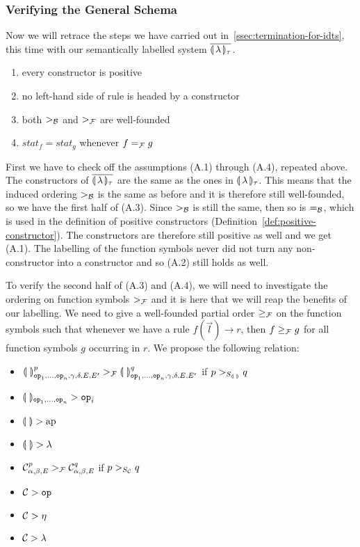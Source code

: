 \subsubsection{Verifying the General Schema}
\label{sssec:general-schema-2}

Now we will retrace the steps we have carried out
in~\ref{ssec:termination-for-idts}, this time with our semantically
labelled system ${\overline{\llparenthesis \, \lambda \, \rrparenthesis_\tau}}$.

\begin{enumerate}
  \item every constructor is positive
  \item no left-hand side of rule is headed by a constructor
  \item both $>_{\mathcal{B}}$ and $>_{\mathcal{F}}$ are well-founded
  \item $stat_f = stat_g$ whenever $f =_{\mathcal{F}} g$
\end{enumerate}

First we have to check off the assumptions (A.1) through (A.4), repeated
above. The constructors of ${\overline{\llparenthesis \, \lambda \, \rrparenthesis_\tau}}$ are the same as the ones in
${\llparenthesis \, \lambda \, \rrparenthesis_\tau}$. This means that the induced ordering $>_{\mathcal{B}}$ is the same as before
and it is therefore still well-founded, so we have the first half of (A.3).
Since $>_{\mathcal{B}}$ is still the same, then so is $=_{\mathcal{B}}$, which is used in the
definition of positive constructors
(Definition~\ref{def:positive-constructor}). The constructors are therefore
still positive as well and we get (A.1). The labelling of the function
symbols never did not turn any non-constructor into a constructor and so
(A.2) still holds as well.

To verify the second half of (A.3) and (A.4), we will need to investigate
the ordering on function symbols $>_{\mathcal{F}}$ and it is here that we will reap
the benefits of our labelling. We need to give a well-founded partial order
$\ge_{\mathcal{F}}$ on the function symbols such that whenever we have a rule
$f(\vec{l}) \to r$, then $f \ge_{\mathcal{F}} g$ for all function symbols $g$
occurring in $r$. We propose the following relation:

\begin{itemize}
\item $\llparenthesis \,  \, \rrparenthesis^p_{\mathtt{op}_1, \ldots, \mathtt{op}_n, \gamma, \delta, E, E'}
  >_{\mathcal{F}} \llparenthesis \,  \, \rrparenthesis^q_{\mathtt{op}_1, \ldots, \mathtt{op}_n, \gamma, \delta, E, E'}$
  if $p >_{S_{\llparenthesis \,  \, \rrparenthesis}} q$
\item $\llparenthesis \,  \, \rrparenthesis_{\mathtt{op}_1, \ldots, \mathtt{op}_n} > \mathtt{op}_i$
\item $\llparenthesis \,  \, \rrparenthesis > \operatorname{ap}$
\item $\llparenthesis \,  \, \rrparenthesis > \lambda$
\item $\mathcal{C}^p_{\alpha,\beta,E} >_{\mathcal{F}} \mathcal{C}^q_{\alpha,\beta,E}$ if
  $p >_{S_{\mathcal{C}}} q$
\item $\mathcal{C} > \mathtt{op}$
\item $\mathcal{C} > \eta$
\item $\mathcal{C} > \lambda$
\end{itemize}

